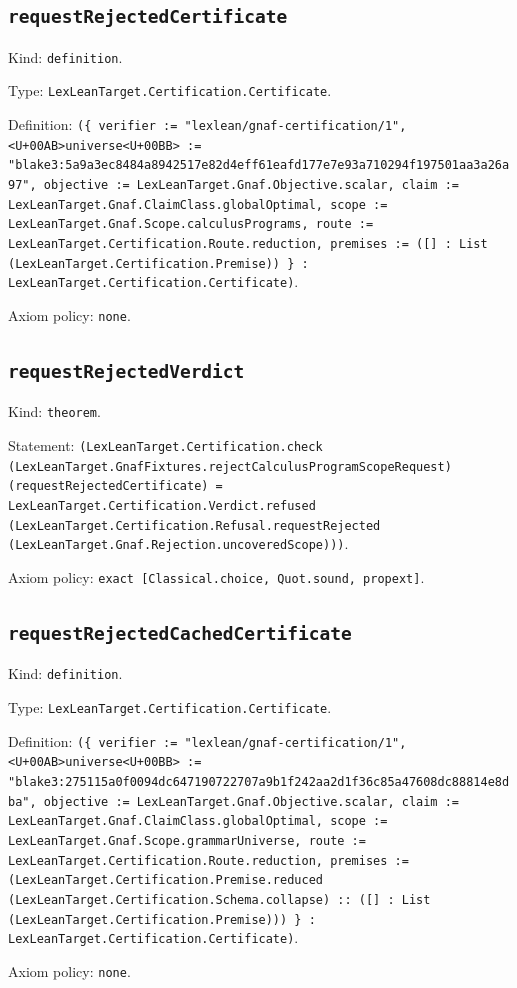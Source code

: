 \documentclass[11pt]{article}
\begin{document}
\subsection*{\texttt{requestRejectedCertificate}}
\noindent Kind: \texttt{definition}.\par
\noindent Type: \texttt{LexLeanTarget.Certification.Certificate}.\par
\noindent Definition: \texttt{(\{ verifier := "lexlean/gnaf-certification/1", <U+00AB>universe<U+00BB> := "blake3:5a9a3ec8484a8942517e82d4eff61eafd177e7e93a710294f197501aa3a26a97", objective := LexLeanTarget.Gnaf.Objective.scalar, claim := LexLeanTarget.Gnaf.ClaimClass.globalOptimal, scope := LexLeanTarget.Gnaf.Scope.calculusPrograms, route := LexLeanTarget.Certification.Route.reduction, premises := ([] : List (LexLeanTarget.Certification.Premise)) \} : LexLeanTarget.Certification.Certificate)}.\par
\noindent Axiom policy: \texttt{none}.\par
\subsection*{\texttt{requestRejectedVerdict}}
\noindent Kind: \texttt{theorem}.\par
\noindent Statement: \texttt{(LexLeanTarget.Certification.check (LexLeanTarget.GnafFixtures.rejectCalculusProgramScopeRequest) (requestRejectedCertificate) = LexLeanTarget.Certification.Verdict.refused (LexLeanTarget.Certification.Refusal.requestRejected (LexLeanTarget.Gnaf.Rejection.uncoveredScope)))}.\par
\noindent Axiom policy: \texttt{exact [Classical.choice, Quot.sound, propext]}.\par
\subsection*{\texttt{requestRejectedCachedCertificate}}
\noindent Kind: \texttt{definition}.\par
\noindent Type: \texttt{LexLeanTarget.Certification.Certificate}.\par
\noindent Definition: \texttt{(\{ verifier := "lexlean/gnaf-certification/1", <U+00AB>universe<U+00BB> := "blake3:275115a0f0094dc647190722707a9b1f242aa2d1f36c85a47608dc88814e8dba", objective := LexLeanTarget.Gnaf.Objective.scalar, claim := LexLeanTarget.Gnaf.ClaimClass.globalOptimal, scope := LexLeanTarget.Gnaf.Scope.grammarUniverse, route := LexLeanTarget.Certification.Route.reduction, premises := (LexLeanTarget.Certification.Premise.reduced (LexLeanTarget.Certification.Schema.collapse) :: ([] : List (LexLeanTarget.Certification.Premise))) \} : LexLeanTarget.Certification.Certificate)}.\par
\noindent Axiom policy: \texttt{none}.\par
\end{document}

